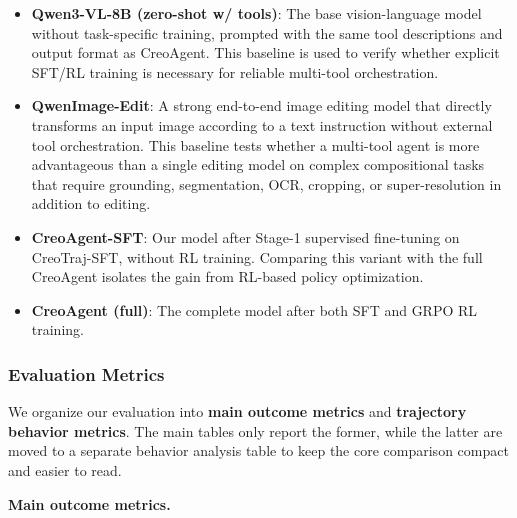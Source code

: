 \documentclass{article}
\begin{document}
\begin{itemize}
    \item \textbf{Qwen3-VL-8B (zero-shot w/ tools)}: The base vision-language model without task-specific training, prompted with the same tool descriptions and output format as CreoAgent. This baseline is used to verify whether explicit SFT/RL training is necessary for reliable multi-tool orchestration.
    \item \textbf{QwenImage-Edit}: A strong end-to-end image editing model that directly transforms an input image according to a text instruction without external tool orchestration. This baseline tests whether a multi-tool agent is more advantageous than a single editing model on complex compositional tasks that require grounding, segmentation, OCR, cropping, or super-resolution in addition to editing.
    \item \textbf{CreoAgent-SFT}: Our model after Stage-1 supervised fine-tuning on CreoTraj-SFT, without RL training. Comparing this variant with the full CreoAgent isolates the gain from RL-based policy optimization.
    \item \textbf{CreoAgent (full)}: The complete model after both SFT and GRPO RL training.
\end{itemize}

\subsubsection{Evaluation Metrics}

We organize our evaluation into \textbf{main outcome metrics} and \textbf{trajectory behavior metrics}. The main tables only report the former, while the latter are moved to a separate behavior analysis table to keep the core comparison compact and easier to read.

\textbf{Main outcome metrics.}
\end{document}
